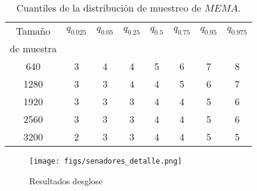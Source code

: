 \documentclass[]{article}
\begin{document}
\begin{table}[ht]
\centering
\begin{tabular}{cccccccc}
\toprule
Tamaño & $q_{0.025}$ & $q_{0.05}$ & $q_{0.25}$ & $q_{0.5}$ & $q_{0.75}$ & $q_{0.95}$ & $q_{0.975}$\\
de muestra & \\
\midrule
\hline

640 & 3 & 4 & 4 & 5 & 6 & 7 & 8\\

1280 & 3 & 3 & 4 & 4 & 5 & 6 & 7\\

1920 & 3 & 3 & 3 & 4 & 4 & 5 & 6\\

2560 & 3 & 3 & 3 & 4 & 4 & 5 & 6\\

3200 & 2 & 3 & 3 & 4 & 4 & 5 & 5\\

\bottomrule
\end{tabular}
\caption{Cuantiles de la distribución de muestreo de $MEMA$.}
\label{tab:cuantiles_mema}
\end{table}



\newpage

\begin{figure}[!htpb]
  \centering
      \texttt{[image: figs/senadores\_detalle.png]}
      \caption{Resultados desglose}
      \label{fig:resultados2018}
\end{figure}
\end{document}
